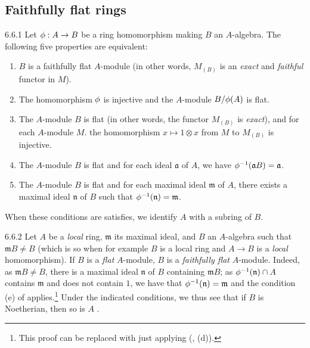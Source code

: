 \subsection{Faithfully flat rings}
\label{0-prelim-6.6}

\begin{env}{6.6.1}
\label{env-0.6.6.1}
Let $\phi:A\to B$ be a ring homomorphism making $B$ an $A$-algebra. The following five
properties are equivalent:
\begin{enumerate}[label=(\alph*)]
  \item $B$ is a faithfully flat $A$-module (in other words, $M_{(B)}$ is an \emph{exact}
        and \emph{faithful} functor in $M$).
  \item The homomorphism $\phi$ is injective and the $A$-module $B/\phi(A)$ is flat.
  \item The $A$-module $B$ is flat (in other words, the functor $M_{(B)}$ is \emph{exact}),
        and for each $A$-module $M$. the homomorphism $x\mapsto 1\otimes x$ from $M$ to
        $M_{(B)}$ is injective.
  \item The $A$-module $B$ is flat and for each ideal $\mathfrak{a}$ of $A$, we have
        $\phi^{-1}(\mathfrak{a}B)=\mathfrak{a}$.
  \item The $A$-module $B$ is flat and for each maximal ideal $\mathfrak{m}$ of $A$, there
        exists a maximal ideal $\mathfrak{n}$ of $B$ such that
        $\phi^{-1}(\mathfrak{n})=\mathfrak{m}$.
\end{enumerate}

When these conditions are satisfies, we identify $A$ with a subring of $B$.
\end{env}

\begin{env}{6.6.2}
\label{env-0.6.6.2}
Let $A$ be a \emph{local} ring, $\mathfrak{m}$ its maximal ideal, and $B$ an $A$-algebra such
that $\mathfrak{m}B\neq B$ (which is so when for example $B$ is a local ring and $A\to B$ is
a \emph{local} homomorphism). If $B$ is a \emph{flat} $A$-module, $B$ is a \emph{faithfully
flat} $A$-module. Indeed, as $\mathfrak{m}B\neq B$, there is a maximal ideal $\mathfrak{n}$
of $B$ containing $\mathfrak{m}B$; as $\phi^{-1}(\mathfrak{n})\cap A$ contains
$\mathfrak{m}$ and does not contain $1$, we have that $\phi^{-1}(\mathfrak{n})=\mathfrak{m}$
and the condition (e) of  applies.\footnote{This proof can be replaced with
just applying (, (d)).} Under the indicated conditions, we thus see that if
$B$ is Noetherian, then so is $A$ .
\end{env}

